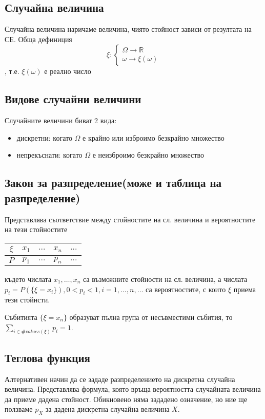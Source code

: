 \documentclass[fleqn,12pt]{article}
\begin{document}
\begin{justify}
\subsection{Случайна величина}
Случайна величина наричаме величина, чиято стойност зависи от резултата на СЕ. Обща дефиниция
\[\xi : \begin{cases}
    \Omega \rightarrow \mathbb{R}\\
    \omega \rightarrow \xi(\omega)
\end{cases} \], т.е. $\xi(\omega)$ е реално число
\subsection{Видове случайни величини}
Случайните величини биват 2 вида:
\begin{itemize}
    \item дискретни: когато $\Omega$ е крайно или изброимо безкрайно множество
    \item непрекъснати: когато $\Omega$ е неизброимо безкрайно множество
\end{itemize}
\subsection{Закон за разпределение(може и таблица на разпределение)}
Представлява съответствие между стойностите на сл. величина и вероятностите на тези стойностите

\begin{tabular}{|c|c|c|c|c|}
    \hline
    $\xi$ & $x_1$ & $\dots$ & $x_n$ & $\dots$ \\
    \hline
    $P$ & $p_1$ & $\dots$ & $p_n$ & $\dots$ \\
    \hline
\end{tabular}

където числата $x_1,\dots,x_n$ са възможните стойности на сл. величина, а числата 
$p_i=P(\{\xi = x_i\}), 0 < p_i < 1, i=1,\dots,n,\dots$ са вероятностите, с които $\xi$ приема тези стойнсти. 

Събитията $\{\xi = x_n\}$ образуват пълна група от несъвместими събития, то $\sum_{i \in \#values(\xi)} p_i = 1$.

\subsection{Теглова функция}
Алтернативен начин да се зададе разпределението на дискретна случайна величина. Представлява формула, която връща
вероятността случайната величина да приеме дадена стойност. Обикновено няма зададено означение, но ние ще ползваме 
$p_X$ за дадена дискретна случайна величина $X$.


\end{justify}
\end{document}
